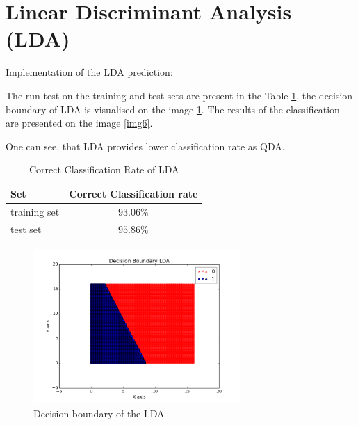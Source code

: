 \documentclass{article}
\begin{document}
\FloatBarrier

\section{Linear Discriminant Analysis (LDA)}

Implementation of the LDA prediction: 



The run test on the training and test sets are present in the Table \ref{Table2}, the decision boundary of LDA is visualised on the image \ref{img5}. The results of the classification are presented on the image \ref{img6}.

One can see, that LDA provides lower classification rate as QDA.
\begin{table}[htb]
	\centering
	\begin{tabular}{|l | c|}
		\hline
		Set & Correct Classification rate \\ \hline
		training set & $93.06\%$  \\ 
		test set &  $95.86\%$ \\ \hline 
	\end{tabular}
\caption{Correct Classification Rate of LDA}
\label{Table2}
\end{table}

\begin{figure}[ht]
	\centering
  	\includegraphics[width=0.7\textwidth]{../DecisionBoundaryLDA.png}
  	\caption{Decision boundary of the LDA}
	\label{img5}
\end{figure}
\end{document}
